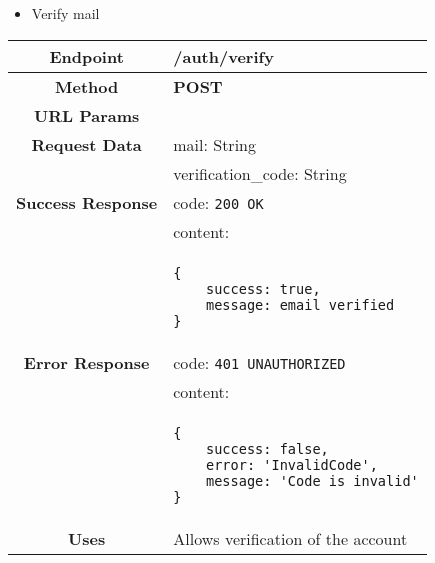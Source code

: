     \begin{itemize}
        \item Verify mail
    \end{itemize}
    \begin{adjustwidth}{1cm}{}
        \begin{longtable}{|c|l|}
            \hline
            \textbf{Endpoint} & /auth/verify \\
            \hline
            \textbf{Method} & \textbf{POST} \\
            \hline
            \textbf{URL Params} &  \\
            \hline
            \textbf{Request Data} & mail: String \\
            &                 verification\_code: String \\
            \hline
            \textbf{Success Response} & code: \texttt{200 OK} \\
            &                           content: \\
            & \begin{minipage}[t]{0.5\textwidth}
                \begin{adjustwidth}{1.5cm}{}
                \begin{verbatim}
{
    success: true, 
    message: email verified
}
                \end{verbatim}
                \end{adjustwidth}
              \end{minipage} \\
              \hline
            \textbf{Error Response} & code: \texttt{401 UNAUTHORIZED} \\
            &                         content: \\
            & \begin{minipage}[t]{0.7\textwidth}
                \begin{adjustwidth}{1.5cm}{}
                \begin{verbatim}
{
    success: false, 
    error: 'InvalidCode',
    message: 'Code is invalid'
}
                \end{verbatim}
                \end{adjustwidth}
              \end{minipage} \\
              \hline
            \textbf{Uses} & Allows verification of the account \\
            \hline
        \end{longtable}
    \end{adjustwidth}
    

